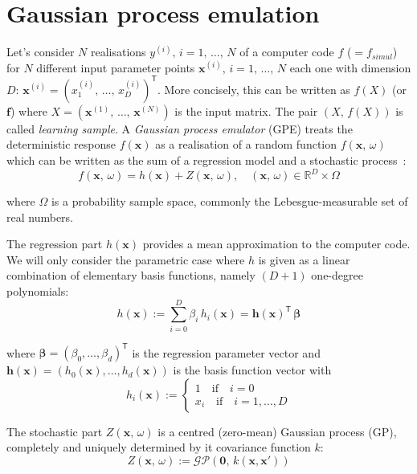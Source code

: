 \section{Gaussian process emulation}\label{sec:ch3gaussianprocessemulation}
Let's consider $N$ realisations $y^{(i)},\,i=1,\,\dots,\,N$ of a computer code $f$ ($=f_{simul}$) for $N$ different input parameter points $\mathbf{x}^{(i)},\,i=1,\,\dots,\,N$ each one with dimension $D$: $\mathbf{x}^{(i)}=(x_{1}^{(i)},\,\dots,\,x_{D}^{(i)})^\mathsf{T}$. More concisely, this can be written as $f(X)$ (or $\mathbf{f}$) where $X=(\mathbf{x}^{(1)},\,\dots,\,\mathbf{x}^{(N)})$ is the input matrix. The pair $(X,\,f(X))$ is called \textit{learning sample}. A \textit{Gaussian process emulator} (\acs{GPE}) treats the deterministic response $f(\mathbf{x})$ as a realisation of a random function $f(\mathbf{x},\,\omega)$ which can be written as the sum of a regression model and a stochastic process~\cite{OHagan:2006}:
\begin{equation}
    f(\mathbf{x},\,\omega) = h(\mathbf{x}) + Z(\mathbf{x},\,\omega), \quad (\mathbf{x},\,\omega)\in\mathbb{R}^D\times\Omega
\end{equation}

\noindent
where $\Omega$ is a probability sample space, commonly the Lebesgue-measurable set of real numbers.

\vspace{0.2cm}
The regression part $h(\mathbf{x})$ provides a mean approximation to the computer code. We will only consider the parametric case where $h$ is given as a linear combination of elementary basis functions, namely $(D+1)$ one-degree polynomials:
%
\begin{equation}
    h(\mathbf{x}):=\sum_{i=0}^D\beta_i\,h_i(\mathbf{x}) = \mathbf{h}(\mathbf{x})^\mathsf{T}\,\boldsymbol{\beta}
\end{equation}

\noindent
where $\boldsymbol{\beta} = (\beta_0,\dots,\beta_d)^\mathsf{T}$ is the regression parameter vector and $\mathbf{h}(\mathbf{x}) = (h_0(\mathbf{x}),\dots,h_d(\mathbf{x}))$ is the basis function vector with
%
\begin{equation}
    h_i(\mathbf{x}):=\begin{cases}
        1 \quad\text{if}\quad i = 0 \\
        x_i \quad\text{if}\quad i=1,\dots,D
    \end{cases}
\end{equation}

The stochastic part $Z(\mathbf{x},\,\omega)$ is a centred (zero-mean) Gaussian process (\acs{GP}), completely and uniquely determined by it covariance function $k$:
%
\begin{equation}
    Z(\mathbf{x},\,\omega):= \mathcal{GP}(\mathbf{0},\,k(\mathbf{x},\mathbf{x'}))
\end{equation}

